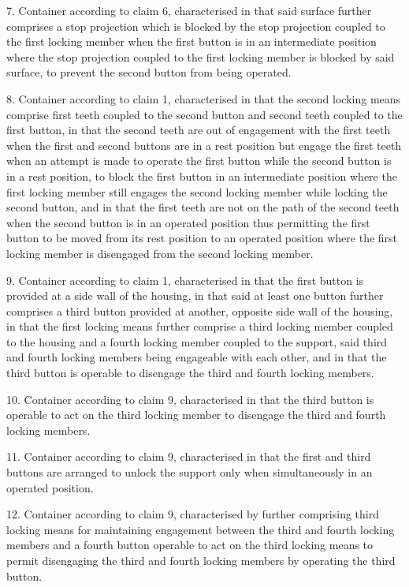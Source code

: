 \documentclass[11pt,a4paper]{article}
\begin{document}
7. Container according to claim 6, characterised in that said surface further comprises a stop projection which is blocked by the stop projection coupled to the first locking member when the first button is in an intermediate position where the stop projection coupled to the first locking member is blocked by said surface, to prevent the second button from being operated.

8. Container according to claim 1, characterised in that the second locking means comprise first teeth coupled to the second button and second teeth coupled to the first button, in that the second teeth are out of engagement with the first teeth when the first and second buttons are in a rest position but engage the first teeth when an attempt is made to operate the first button while the second button is in a rest position, to block the first button in an intermediate position where the first locking member still engages the second locking member while locking the second button, and in that the first teeth are not on the path of the second teeth when the second button is in an operated position thus permitting the first button to be moved from its rest position to an operated position where the first locking member is disengaged from the second locking member.

9. Container according to claim 1, characterised in that the first button is provided at a side wall of the housing, in that said at least one button further comprises a third button provided at another, opposite side wall of the housing, in that the first locking means further comprise a third locking member coupled to the housing and a fourth locking member coupled to the support, said third and fourth locking members being engageable with each other, and in that the third button is operable to disengage the third and fourth locking members.

10. Container according to claim 9, characterised in that the third button is operable to act on the third locking member to disengage the third and fourth locking members.

11. Container according to claim 9, characterised in that the first and third buttons are arranged to unlock the support only when simultaneously in an operated position.

12. Container according to claim 9, characterised by further comprising third locking means for maintaining engagement between the third and fourth locking members and a fourth button operable to act on the third locking means to permit disengaging the third and fourth locking members by operating the third button.
\end{document}
